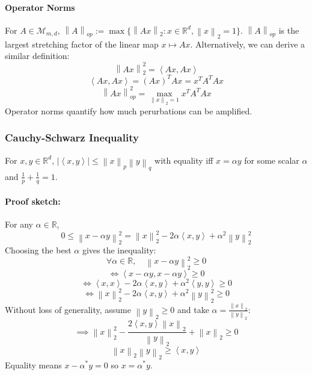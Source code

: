 \documentclass[12pt,oneside]{book}
\numberwithin{equation}{section}
\theoremstyle{definition}
\theoremstyle{plain}
\theoremstyle{remark}
\newcommand{\R}{\mathbb{R}}
\newcommand{\norm}[1]{\left\lVert #1 \right\rVert}
\newcommand{\inner}[2]{\left\langle #1, #2 \right\rangle}
\begin{document}
\paragraph{Operator Norms}
For $A \in \mathcal{M}_{m,d}$, $\norm{A}_{op} := \max \{\norm{Ax}_2 : x \in \R^d, \norm{x}_2 = 1\}$. $\norm{A}_{op}$ is the largest stretching factor of the linear map $x \mapsto Ax$. Alternatively, we can derive a similar definition:
\[\norm{Ax}_2^2 = \inner{Ax}{Ax}\]
\[\inner{Ax}{Ax} = (Ax)^TAx = x^TA^TAx\]
\[\norm{Ax}_{op}^2 = \max_{\norm{x}_2 = 1} x^TA^TAx\]
Operator norms quantify how much perurbations can be amplified. 

\subsubsection{Cauchy-Schwarz Inequality}
For $x,y \in \R^d$, $|\inner{x}{y}| \le \norm{x}_p\norm{y}_q$ with equality iff $x = \alpha y$ for some scalar $\alpha$ and $\frac{1}{p}+\frac{1}{q}=1$.

\paragraph{Proof sketch:} For any $\alpha \in \R$, 
\[
0 \le \norm{x - \alpha y}_2^2 = \norm{x}_2^2 - 2\alpha \inner{x}{y} + \alpha^2 \norm{y}_2^2
\]
Choosing the best $\alpha$ gives the inequality:
\[\forall \alpha \in \R, \quad \norm{x - \alpha y}_2^2 \ge 0\]
\[\iff \inner{x-\alpha y}{x- \alpha y} \ge 0\]
\[\iff \inner{x}{x} - 2\alpha \inner{x}{y} + \alpha^2 \inner{y}{y} \ge 0\]
\[\iff \norm{x}_2^2 - 2\alpha \inner{x}{y} + \alpha^2 \norm{y}_2^2 \ge 0\]
Without loss of generality, assume $\norm{y}_2 \ge 0$ and take $\alpha = \frac{\norm{x}_2}{\norm{y}_2}$:
\[\implies \norm{x}_2^2 - \frac{2 \inner{x}{y}\norm{x}_2}{\norm{y}_2} + \norm{x}_2 \ge 0\]
\[\norm{x}_2 \norm{y}_2 \ge \inner{x}{y}\]
Equality means $x - \alpha^* y = 0$ so $x = \alpha^* y$.
\end{document}
